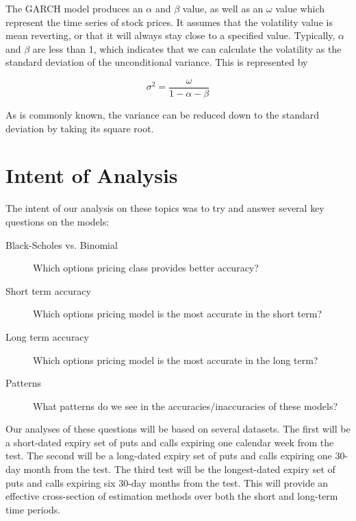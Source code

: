The GARCH model produces an $\alpha$ and $\beta$ value, as well as an $\omega$ value which represent the time series of stock prices. It assumes that the volatility value is mean reverting, or that it will always stay close to a specified value. Typically, $\alpha$ and $\beta$ are less than 1, which indicates that we can calculate the volatility as the standard deviation of the unconditional variance. This is represented by

\begin{equation}
\sigma^2 = \frac{\omega}{1 - \alpha - \beta}
\end{equation}

As is commonly known, the variance can be reduced down to the standard deviation by taking its square root.

\section{Intent of Analysis}

The intent of our analysis on these topics was to try and answer several key questions on the models:

\begin{description}
\item[Black-Scholes vs. Binomial] Which options pricing class provides better accuracy?
\item[Short term accuracy] Which options pricing model is the most accurate in the short term?
\item[Long term accuracy] Which options pricing model is the most accurate in the long term?
\item[Patterns] What patterns do we see in the accuracies/inaccuracies of these models?
\end{description}

Our analyses of these questions will be based on several datasets. The first will be a short-dated expiry set of puts and calls expiring one calendar week from the test. The second will be a long-dated expiry set of puts and calls expiring one 30-day month from the test. The third test will be the longest-dated expiry set of puts and calls expiring six 30-day months from the test. This will provide an effective cross-section of estimation methods over both the short and long-term time periods. 


